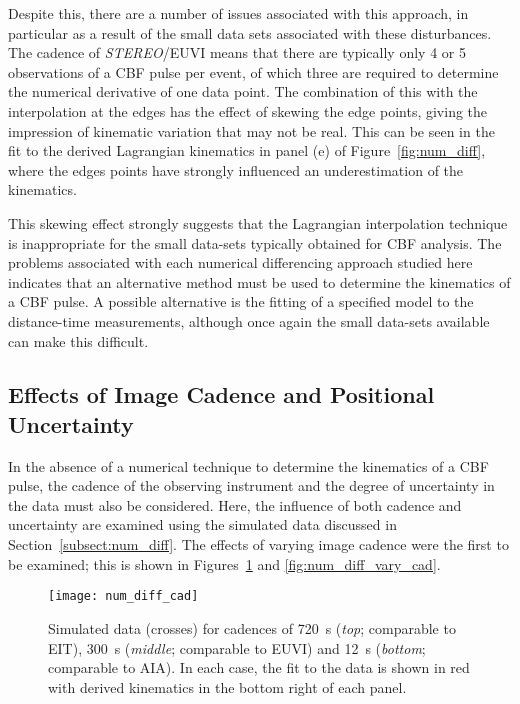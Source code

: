 Despite this, there are a number of issues associated with this approach, in particular as a result of the small data sets associated with these disturbances. The cadence of \emph{STEREO}/EUVI means that there are typically only 4 or 5 observations of a CBF pulse per event, of which three are required to determine the numerical derivative of one data point. The combination of this with the interpolation at the edges has the effect of skewing the edge points, giving the impression of kinematic variation that may not be real. This can be seen in the fit to the derived Lagrangian kinematics in panel (e) of Figure~\ref{fig:num_diff}, where the edges points have strongly influenced an underestimation of the kinematics. 

This skewing effect strongly suggests that the Lagrangian interpolation technique is inappropriate for the small data-sets typically obtained for CBF analysis. The problems associated with each numerical differencing approach studied here indicates that an alternative method must be used to determine the kinematics of a CBF pulse. A possible alternative is the fitting of a specified model to the distance-time measurements, although once again the small data-sets available can make this difficult. 

\subsection{Effects of Image Cadence and Positional Uncertainty}
\label{subsect:img_cad}

In the absence of a numerical technique to determine the kinematics of a CBF pulse, the cadence of the observing instrument and the degree of uncertainty in the data must also be considered. Here, the influence of both cadence and uncertainty are examined using the simulated data discussed in Section~\ref{subsect:num_diff}. The effects of varying image cadence were the first to be examined; this is shown in Figures~\ref{fig:num_diff_cad} and \ref{fig:num_diff_vary_cad}. 

\begin{figure}[!t]
\begin{center}
\texttt{[image: num\_diff\_cad]}
\caption{Simulated data (crosses) for cadences of 720~s (\emph{top}; comparable to EIT), 300~s  (\emph{middle}; comparable to EUVI) and 12~s  (\emph{bottom}; comparable to AIA). In each case, the fit to the data is shown in red with derived kinematics in the bottom right of each panel.}
\label{fig:num_diff_cad}
\end{center}
\end{figure}

